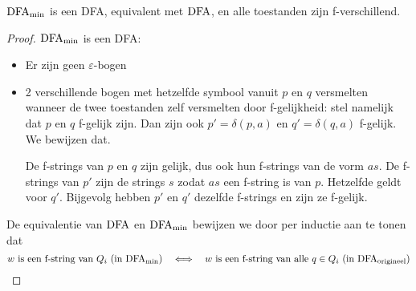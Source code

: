 \documentclass[../aanvullingen_cursus.tex]{subfiles}
\begin{document}
\begin{stelling}
	\(\text{DFA}_{\text{min}}\) is een DFA, equivalent met \(\text{DFA}\), en alle toestanden zijn f-verschillend.
\end{stelling}

\begin{proof}
	\(\text{DFA}_{\text{min}}\) is een DFA:
	\begin{itemize}
		\item Er zijn geen \(\varepsilon\)-bogen
		\item 2 verschillende bogen met hetzelfde symbool vanuit \(p\) en \(q\)  versmelten wanneer de twee toestanden zelf versmelten door f-gelijkheid:
		stel namelijk dat \(p\) en \(q\) f-gelijk zijn. Dan zijn ook \( p'=\delta(p,a) \) en \( q'=\delta(q,a) \) f-gelijk. We bewijzen dat.

		De f-strings van \(p\) en \(q\) zijn gelijk, dus ook hun f-strings van de vorm \(as\). De f-strings van \(p'\) zijn de strings \( s \) zodat \( as \) een f-string is van \( p \). Hetzelfde geldt voor \( q' \). Bijgevolg hebben \( p' \) en \( q' \) dezelfde f-strings en zijn ze f-gelijk.
	\end{itemize}

	De equivalentie van \(\text{DFA}\) en \(\text{DFA}_{\text{min}}\) bewijzen we door per inductie aan te tonen dat \[ w \text{ is een f-string van } Q_i \text{ (in } \text{DFA}_{\text{min}} \text{)} \quad \Longleftrightarrow \quad w \text{ is een f-string van alle } q\in Q_i \text{ (in } \text{DFA}_{\text{origineel}} \text{)}\]


\end{proof}
\end{document}
